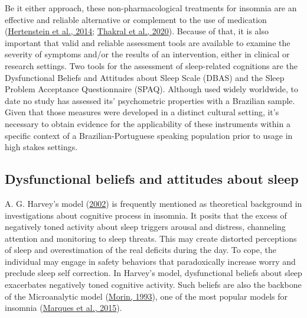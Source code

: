 \documentclass[
  ,doc,11pt, twoside,floatsintext]{apa6}
\begin{document}
Be it either approach, these non-pharmacological treatments for insomnia are an effective and reliable alternative or complement to the use of medication (\protect\hyperlink{ref-hertenstein2014}{Hertenstein et al., 2014}; \protect\hyperlink{ref-thakral2020}{Thakral et al., 2020}). Because of that, it is also important that valid and reliable assessment tools are available to examine the severity of symptoms and/or the results of an intervention, either in clinical or research settings. Two tools for the assessment of sleep-related cognitions are the Dysfunctional Beliefs and Attitudes about Sleep Scale (DBAS) and the Sleep Problem Acceptance Questionnaire (SPAQ). Although used widely worldwide, to date no study has assessed its' psychometric properties with a Brazilian sample. Given that those measures were developed in a distinct cultural setting, it's necessary to obtain evidence for the applicability of these instruments within a specific context of a Brazilian-Portuguese speaking population prior to usage in high stakes settings.

\hypertarget{dysfunctional-beliefs-and-attitudes-about-sleep}{%
\subsection{Dysfunctional beliefs and attitudes about sleep}\label{dysfunctional-beliefs-and-attitudes-about-sleep}}

A. G. Harvey's model (\protect\hyperlink{ref-harvey2002}{2002}) is frequently mentioned as theoretical background in investigations about cognitive process in insomnia. It posits that the excess of negatively toned activity about sleep triggers arousal and distress, channeling attention and monitoring to sleep threats. This may create distorted perceptions of sleep and overestimation of the real deficits during the day. To cope, the individual may engage in safety behaviors that paradoxically increase worry and preclude sleep self correction. In Harvey's model, dysfunctional beliefs about sleep exacerbates negatively toned cognitive activity. Such beliefs are also the backbone of the Microanalytic model (\protect\hyperlink{ref-morin1993insomnia}{Morin, 1993}), one of the most popular models for insomnia (\protect\hyperlink{ref-marques2015}{Marques et al., 2015}).
\end{document}
